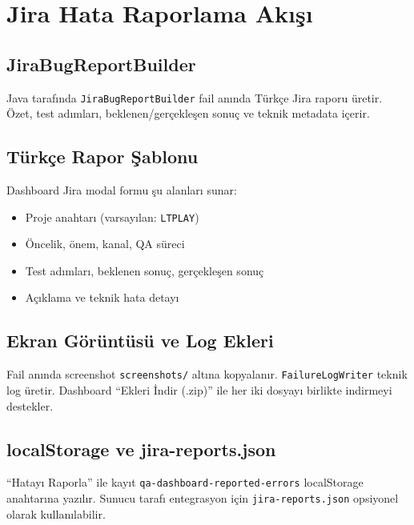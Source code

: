 \chapter{Jira Hata Raporlama Akışı}

\section{JiraBugReportBuilder}
Java tarafında \texttt{JiraBugReportBuilder} fail anında Türkçe Jira raporu üretir. Özet, test adımları, beklenen/gerçekleşen sonuç ve teknik metadata içerir.

\section{Türkçe Rapor Şablonu}
Dashboard Jira modal formu şu alanları sunar:
\begin{itemize}
  \item Proje anahtarı (varsayılan: \texttt{LTPLAY})
  \item Öncelik, önem, kanal, QA süreci
  \item Test adımları, beklenen sonuç, gerçekleşen sonuç
  \item Açıklama ve teknik hata detayı
\end{itemize}

\section{Ekran Görüntüsü ve Log Ekleri}
Fail anında screenshot \texttt{screenshots/} altına kopyalanır. \texttt{FailureLogWriter} teknik log üretir. Dashboard ``Ekleri İndir (.zip)'' ile her iki dosyayı birlikte indirmeyi destekler.

\section{localStorage ve jira-reports.json}
``Hatayı Raporla'' ile kayıt \texttt{qa-dashboard-reported-errors} localStorage anahtarına yazılır. Sunucu tarafı entegrasyon için \texttt{jira-reports.json} opsiyonel olarak kullanılabilir.

